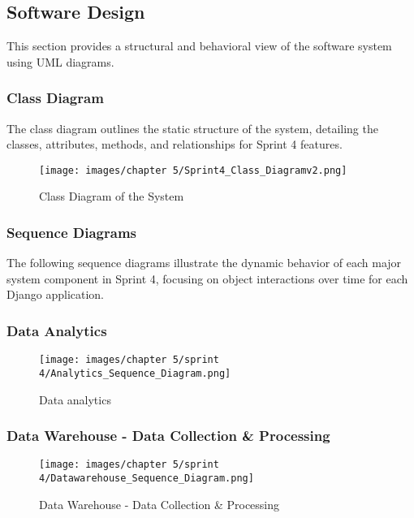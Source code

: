 \subsection{Software Design}

This section provides a structural and behavioral view of the software system using UML diagrams.

\subsubsection{Class Diagram}

The class diagram outlines the static structure of the system, detailing the classes, attributes, methods, and relationships for Sprint 4 features.

\begin{figure}[H]
    \centering
    \texttt{[image: images/chapter 5/Sprint4\_Class\_Diagramv2.png]}
    \caption{Class Diagram of the System}
    \label{fig:class-diagram-sprint4}
\end{figure}

\subsubsection{Sequence Diagrams}

The following sequence diagrams illustrate the dynamic behavior of each major system component in Sprint 4, focusing on object interactions over time for each Django application.

\subsubsection*{Data Analytics}
\begin{figure}[H]
    \centering
    \texttt{[image: images/chapter 5/sprint 4/Analytics\_Sequence\_Diagram.png]}
    \caption{Data analytics}
    \label{fig:analytics-sequence-diagram}
\end{figure}


\subsubsection*{Data Warehouse - Data Collection \& Processing}
\begin{figure}[H]
    \centering
    \texttt{[image: images/chapter 5/sprint 4/Datawarehouse\_Sequence\_Diagram.png]}
    \caption{Data Warehouse - Data Collection \& Processing}
    \label{fig:Datawarehouse-sequence-diagram}
\end{figure}



